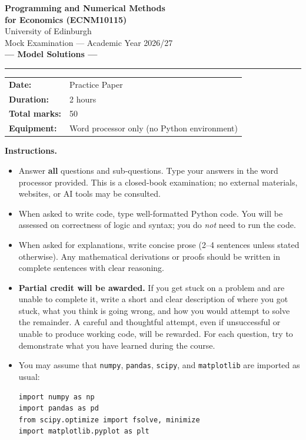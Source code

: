 \documentclass[11pt,a4paper]{article}
\begin{document}

\begin{center}
{\LARGE\bfseries Programming and Numerical Methods\\[2pt] for Economics (ECNM10115)}\\[10pt]
{\large University of Edinburgh}\\[4pt]
{\large Mock Examination --- Academic Year 2026/27}\\[6pt]
{\large\color{blue!60!black}\bfseries --- Model Solutions ---}\\[10pt]
\rule{0.7\textwidth}{0.4pt}
\end{center}

\vspace{4pt}

\noindent
\begin{tabular}{@{}ll}
\textbf{Date:}     & Practice Paper \\
\textbf{Duration:} & 2 hours \\
\textbf{Total marks:} & 50 \\
\textbf{Equipment:} & Word processor only (no Python environment) \\
\end{tabular}

\vspace{6pt}

\noindent\textbf{Instructions.}
\begin{itemize}[nosep,leftmargin=1.4em]
\item Answer \textbf{all} questions and sub-questions.  Type your answers in the word
      processor provided.  This is a closed-book examination; no external
      materials, websites, or AI tools may be consulted.
\item When asked to write code, type well-formatted Python code.  You will be
      assessed on correctness of logic and syntax; you do \emph{not} need to
      run the code.
\item When asked for explanations, write concise prose (2--4 sentences unless
      stated otherwise).  Any mathematical derivations or proofs should be
      written in complete sentences with clear reasoning.
\item \textbf{Partial credit will be awarded.}  If you get stuck on a problem and
      are unable to complete it, write a short and clear description of where
      you got stuck, what you think is going wrong, and how you would attempt
      to solve the remainder.  A careful and thoughtful attempt, even if
      unsuccessful or unable to produce working code, will be rewarded.  For
      each question, try to demonstrate what you have learned during the
      course.
\item You may assume that \texttt{numpy}, \texttt{pandas}, \texttt{scipy}, and
      \texttt{matplotlib} are imported as usual:
\begin{lstlisting}[numbers=none]
import numpy as np
import pandas as pd
from scipy.optimize import fsolve, minimize
import matplotlib.pyplot as plt
\end{lstlisting}
\end{itemize}
\end{document}
